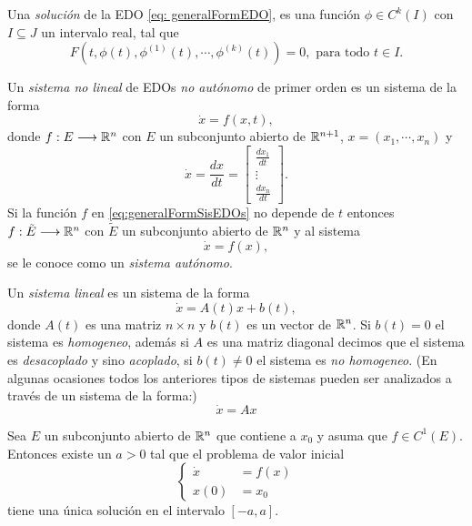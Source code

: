     Una \textit{solución} de la EDO \eqref{eq: generalFormEDO}, es una función $\phi \in C^{k}(I)$ con $I \subseteq J$ un intervalo real, tal que
    \begin{equation}
    	F(t, \phi(t), \phi^{(1)}(t), \cdots, \phi^{(k)}(t)) = 0, \text{ para todo } t \in I.
    \end{equation}
    
    Un \textit{sistema no lineal} de EDOs \textit{no autónomo} de primer orden es un sistema de la forma
    \begin{equation}
    	\dot{x} = f(x, t),
    	\label{eq:generalFormSisEDOs}
    \end{equation}
    donde $f:E \longrightarrow {\mathbb{R}}^{n}$ con $E$ un subconjunto abierto de ${\mathbb{R}}^{n+1}$, $x = (x_{1}, \cdots, x_{n})$ y
    \begin{equation*}
    	\dot{x} = \frac{dx}{dt} = 
    	\begin{bmatrix}
    		\frac{dx_{1}}{dt} \\
    		\vdots \\
    		\frac{dx_{n}}{dt}
    	\end{bmatrix}.
    \end{equation*}
    Si la función $f$ en \eqref{eq:generalFormSisEDOs} no depende de $t$ entonces $f:\tilde{E} \longrightarrow {\mathbb{R}}^{n}$ con $\tilde{E}$ un subconjunto abierto de ${\mathbb{R}}^{n}$ y al sistema 
    \begin{equation}
    	\dot{x} = f(x),
    	\label{eq: sisAut}
    \end{equation} 
    se le conoce como un \textit{sistema autónomo}.
    
    Un \textit{sistema lineal} es un sistema de la forma
    \begin{equation}
    	\dot{x} = A(t)x + b(t),
    	\label{eq: sistemaLineal}
    \end{equation}
    donde $A(t)$ es una matriz $n \times n$ y $b(t)$ es un vector de ${\mathbb{R}}^{n}$. Si $b(t) = 0$ el sistema es \textit{homogeneo}, además si $A$ es una matriz diagonal decimos que el sistema es \textit{desacoplado} y sino \textit{acoplado}, si $b(t) \neq 0$ el sistema es \textit{no homogeneo}. (En algunas ocasiones todos los anteriores tipos de sistemas pueden ser analizados a través de un sistema de la forma:)
    \begin{equation}
    	\dot{x} = Ax
    	\label{eq: sisLinAuto}
    \end{equation}
    
    Sea $E$ un subconjunto abierto de ${\mathbb{R}}^{n}$ que contiene a $x_{0}$ y asuma que $f \in C^{1}(E)$. Entonces existe un $a>0$ tal que el problema de valor inicial 
    \begin{equation}
    	\left\{
    	\begin{aligned}
    		\dot{x} &= f(x) \\
    		x(0) &= x_{0}
    	\end{aligned}
    	\right.
    	\label{eq: pvi}
    \end{equation}
    tiene una única solución en el intervalo $[-a,a]$.
    
